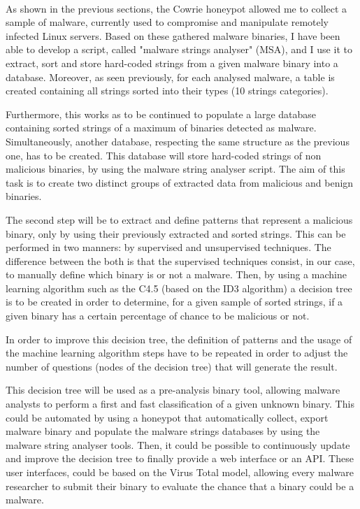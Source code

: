 \paragraph{}

As shown in the previous sections, the Cowrie honeypot allowed me to collect a sample
of malware, currently used to compromise and manipulate remotely infected Linux servers.
Based on these gathered malware binaries, I have been able to develop a script,
called "malware strings analyser" (MSA), and I use it to extract, sort and store hard-coded
strings from a given malware binary into a database. Moreover, as seen previously, for each
analysed malware, a table is created containing all strings sorted into their types (10 
strings categories).

Furthermore, this works as to be continued to populate a large database containing sorted
strings of a maximum of binaries detected as malware.
Simultaneously, another database, respecting the same structure as the previous one, has to
be created. This database will store hard-coded strings of non malicious binaries, by using
the malware string analyser script. The aim of this task is to create two distinct groups
of extracted data from malicious and benign binaries.

The second step will be to extract and define patterns that represent a malicious binary,
only by using their previously extracted and sorted strings. This can be performed in two
manners: by supervised and unsupervised techniques. The difference between the both is that
the supervised techniques consist, in our case, to manually define which binary is or not
a malware. Then, by using a machine learning algorithm such as the C4.5 (based on the ID3 
algorithm) \cite{id3} a decision tree is to be created in order to determine, for a given sample of
sorted strings, if a given binary has a certain percentage of chance to be malicious or not.

In order to improve this decision tree, the definition of patterns and the usage of the 
machine learning algorithm steps have to be repeated in order to adjust the number of
questions (nodes of the decision tree) that will generate the result.

This decision tree will be used as a pre-analysis binary tool, allowing malware analysts
to perform a first and fast classification of a given unknown binary.
This could be automated by using a honeypot that automatically collect, export malware
binary and populate the malware strings databases by using the malware string analyser
tools. Then, it could be possible to continuously update and improve the decision tree to 
finally provide a web interface or an API. These user interfaces,
could be based on the Virus Total model, allowing every malware researcher to submit their
binary to evaluate the chance that a binary could be a malware.